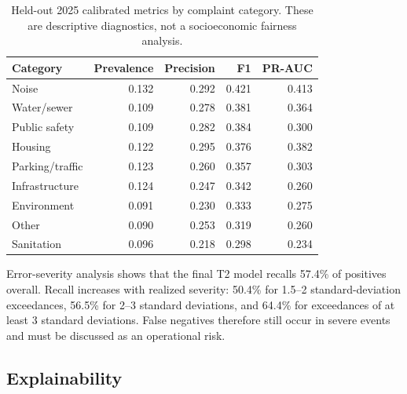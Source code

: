 \documentclass[pdflatex,sn-mathphys-num]{sn-jnl}
\begin{document}
\begin{table}[!htbp]
\caption{Held-out 2025 performance by historical reporting-volume decile. Deciles use information available by the end of the feature week and are descriptive volume strata, not a socioeconomic fairness analysis.}\label{tab:volume_deciles}
\centering\small

\end{table}

\begin{table}[!htbp]
\caption{Held-out 2025 calibrated metrics by complaint category. These are descriptive diagnostics, not a socioeconomic fairness analysis.}\label{tab:category_metrics}
\centering\small
\begin{tabular}{@{}lrrrr@{}}
\toprule
Category & Prevalence & Precision & F1 & PR-AUC \\
\midrule
Noise & 0.132 & 0.292 & 0.421 & 0.413 \\
Water/sewer & 0.109 & 0.278 & 0.381 & 0.364 \\
Public safety & 0.109 & 0.282 & 0.384 & 0.300 \\
Housing & 0.122 & 0.295 & 0.376 & 0.382 \\
Parking/traffic & 0.123 & 0.260 & 0.357 & 0.303 \\
Infrastructure & 0.124 & 0.247 & 0.342 & 0.260 \\
Environment & 0.091 & 0.230 & 0.333 & 0.275 \\
Other & 0.090 & 0.253 & 0.319 & 0.260 \\
Sanitation & 0.096 & 0.218 & 0.298 & 0.234 \\
\bottomrule
\end{tabular}
\end{table}

Error-severity analysis shows that the final T2 model recalls 57.4\% of positives overall. Recall increases with realized severity: 50.4\% for 1.5--2 standard-deviation exceedances, 56.5\% for 2--3 standard deviations, and 64.4\% for exceedances of at least 3 standard deviations. False negatives therefore still occur in severe events and must be discussed as an operational risk.

\subsection{Explainability}\label{subsec:explainability}
\end{document}
